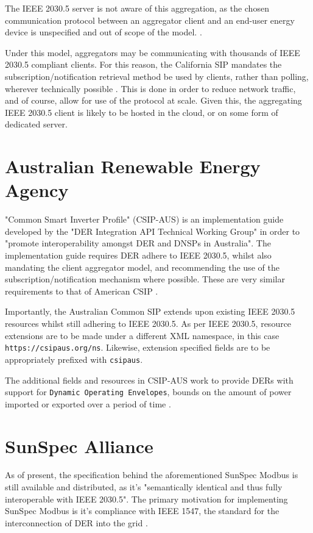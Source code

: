 The IEEE 2030.5 server is not aware of this aggregation, as the chosen communication protocol between an aggregator client and an end-user energy device is unspecified and out of scope of the model. \cite{csipimpl} \cite{20305workshop}. 

Under this model, aggregators may be communicating with thousands of IEEE 2030.5 compliant clients. For this reason, the California SIP mandates the subscription/notification retrieval method be used by clients, rather than polling, wherever technically possible  \cite{csipimpl}.
This is done in order to reduce network traffic, and of course, allow for use of the protocol at scale.
Given this, the aggregating IEEE 2030.5 client is likely to be hosted in the cloud, or on some form of dedicated server.


\section{Australian Renewable Energy Agency}
"Common Smart Inverter Profile" (CSIP-AUS) is an implementation guide developed by the "DER Integration API Technical Working Group" in order to "promote interoperability amongst DER and DNSPs in Australia".
The implementation guide requires DER adhere to IEEE 2030.5, whilst also mandating the client aggregator model, and recommending the use of the subscription/notification mechanism where possible. These are very similar requirements to that of American CSIP \cite[]{CSIPAus}. 

Importantly, the Australian Common SIP extends upon existing IEEE 2030.5 resources whilst still adhering to IEEE 2030.5.
As per IEEE 2030.5, resource extensions are to be made under a different XML namespace, in this case \texttt{https://csipaus.org/ns}. Likewise, extension specified fields are to be appropriately prefixed with \texttt{csipaus}. 

The additional fields and resources in CSIP-AUS work to provide DERs with support for \texttt{Dynamic Operating Envelopes}, bounds on the amount of power imported or exported over a period of time \cite[]{CSIPAus}. 

\section{SunSpec Alliance}

As of present, the specification behind the aforementioned SunSpec Modbus is still available and distributed, as it's "semantically identical and thus fully interoperable with IEEE 2030.5". 
The primary motivation for implementing SunSpec Modbus is it's compliance with IEEE 1547, the standard for the interconnection of DER into the grid \cite[]{SunSpecModbus}. 

